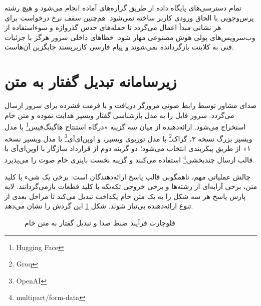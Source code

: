 \documentclass[11pt, a4paper]{report}
\newcommand{\enfootnote}[1]{\footnote{\foreignlanguage{english}{#1}}}
\begin{document}
تمام دسترسی‌های پایگاه داده از طریق گزاره‌های آماده انجام می‌شود و هیچ رشته پرس‌وجویی با الحاق ورودی کاربر ساخته نمی‌شود. هم‌چنین سقف نرخ درخواست برای هر نشانی مبدأ اعمال می‌گردد تا حمله‌های حدس گذرواژه و سوءاستفاده از وب‌سرویس‌های پولی هوش مصنوعی مهار شود. خطاهای داخلی سرور هرگز با جزئیات فنی به کلاینت بازگردانده نمی‌شوند و پیام فارسی کاربرپسند جایگزین آن‌هاست.

\section{زیرسامانه تبدیل گفتار به متن}
صدای مشاور توسط رابط صوتی مرورگر دریافت و با فرمت فشرده برای سرور ارسال می‌گردد. سرور فایل را به مدل بازشناسی گفتار ویسپر هدایت نموده و متن خام استخراج می‌شود. ارائه‌دهنده از میان سه گزینه «درگاه استنتاج هاگینگ‌فیس\enfootnote{Hugging Face} با مدل ویسپر بزرگ نسخه ۳، گراک\enfootnote{Groq} با مدل توربوی ویسپر، و اوپن‌ای‌آی\enfootnote{OpenAI} با مدل ویسپر نسخه ۱» از طریق پیکربندی انتخاب می‌شود؛ دو گزینه دوم از قرارداد سازگار با اوپن‌ای‌آی با قالب ارسال چندبخشی\enfootnote{multipart/form-data} استفاده می‌کنند و گزینه نخست باینری خام صوت را می‌پذیرد.

چالش عملیاتی مهم، ناهمگونی قالب پاسخ ارائه‌دهندگان است: برخی یک شیء با کلید متن، برخی آرایه‌ای از رشته‌ها و برخی خروجی تکه‌تکه با کلید قطعات بازمی‌گردانند. لایه پارس پاسخ هر سه شکل را به یک متن خام یکداخت تبدیل می‌کند تا مراحل بعدی از تنوع ارائه‌دهنده بی‌نیاز شوند. شکل \ref{fig:stt_flow} این گردش را نشان می‌دهد.

\begin{figure}[htbp]
  \centering
  \caption{فلوچارت فرآیند ضبط صدا و تبدیل گفتار به متن خام}
  \label{fig:stt_flow}
\end{figure}
\end{document}
